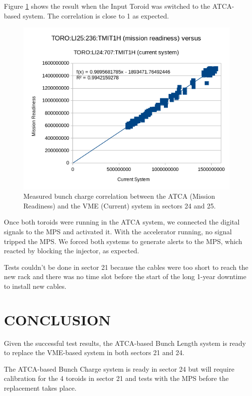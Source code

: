 \documentclass[letter,
        biblatex,   %
        keeplastbox,  %
        ]{jacow}
\begin{document}
Figure \ref{fig:bcm_result} shows the result when the Input Toroid was switched to the ATCA-based system. The correlation is close to 1 as expected.

\begin{figure}[!htb]
  \centering
  \includegraphics*[width=\columnwidth]{bcm_result}
  \caption{Measured bunch charge correlation between the ATCA (Mission Readiness) and the VME (Current) system in sectors 24 and 25.}
  \label{fig:bcm_result}
\end{figure}

Once both toroids were running in the ATCA system, we connected the digital signals to the MPS and activated it. With the accelerator running, no signal tripped the MPS. We forced both systems to generate alerts to the MPS, which reacted by blocking the injector, as expected.

Tests couldn't be done in sector 21 because the cables were too short to reach the new rack and there was no time slot before the start of the long 1-year downtime to install new cables.

\section{CONCLUSION}
Given the successful test results, the ATCA-based Bunch Length system is ready to replace the VME-based system in both sectors 21 and 24.

The ATCA-based Bunch Charge system is ready in sector 24 but will require calibration for the 4 toroids in sector 21 and tests with the MPS before the replacement takes place.
\end{document}

